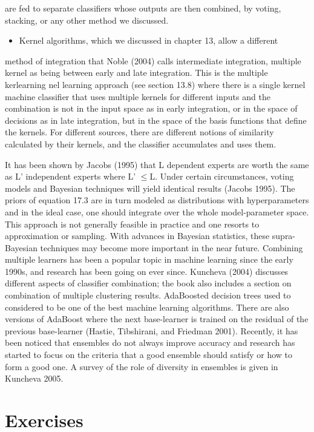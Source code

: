 are fed to separate classifiers whose outputs are then combined, by voting, stacking, or any other method we discussed.

\begin{itemize}
\item Kernel algorithms, which we discussed in chapter 13, allow a different
\end{itemize}

method of integration that Noble (2004) calls intermediate integration, multiple kernel as being between early and late integration. This is the multiple kerlearning nel learning approach (see section 13.8) where there is a single kernel machine classifier that uses multiple kernels for different inputs and the combination is not in the input space as in early integration, or in the space of decisions as in late integration, but in the space of the basis functions that define the kernels. For different sources, there are different notions of similarity calculated by their kernels, and the classifier accumulates and uses them.

It has been shown by Jacobs (1995) that L dependent experts are worth the same as L' independent experts where L' $\leq$L. Under certain circumstances, voting models and Bayesian techniques will yield identical results (Jacobs 1995). The priors of equation 17.3 are in turn modeled as distributions with hyperparameters and in the ideal case, one should integrate over the whole model-parameter space. This approach is not generally feasible in practice and one resorts to approximation or sampling. With advances in Bayesian statistics, these supra-Bayesian techniques may become more important in the near future. Combining multiple learners has been a popular topic in machine learning since the early 1990s, and research has been going on ever since. Kuncheva (2004) discusses different aspects of classifier combination; the book also includes a section on combination of multiple clustering results. AdaBoosted decision trees used to considered to be one of the best machine learning algorithms. There are also versions of AdaBoost where the next base-learner is trained on the residual of the previous base-learner (Hastie, Tibshirani, and Friedman 2001). Recently, it has been noticed that ensembles do not always improve accuracy and research has started to focus on the criteria that a good ensemble should satisfy or how to form a good one. A survey of the role of diversity in ensembles is given in Kuncheva 2005.

\section{Exercises}

